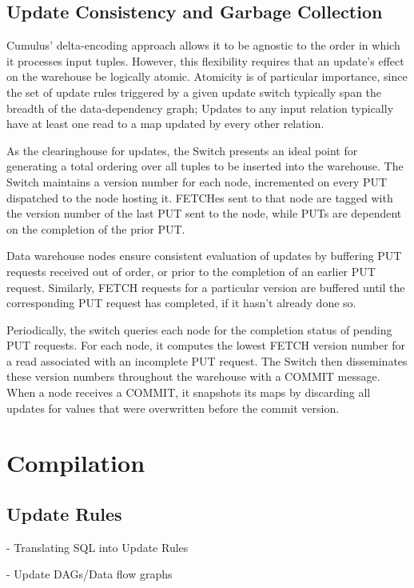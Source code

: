 \documentclass{sig-alternate}
\begin{document}
\subsection{Update Consistency and Garbage Collection}

Cumulus' delta-encoding approach allows it to be agnostic to the order in which it processes input tuples.  However, this flexibility requires that an update's effect on the warehouse be logically atomic.  Atomicity is of particular importance, since the set of update rules triggered by a given update switch typically span the breadth of the data-dependency graph; Updates to any input relation typically have at least one read to a map updated by every other relation.

As the clearinghouse for updates, the Switch presents an ideal point for generating a total ordering over all tuples to be inserted into the warehouse.  The Switch maintains a version number for each node, incremented on every PUT dispatched to the node hosting it.  FETCHes sent to that node are tagged with the version number of the last PUT sent to the node, while PUTs are dependent on the completion of the prior PUT.

Data warehouse nodes ensure consistent evaluation of updates by buffering PUT requests received out of order, or prior to the completion of an earlier PUT request.  Similarly, FETCH requests for a particular version are buffered until the corresponding PUT request has completed, if it hasn't already done so.

Periodically, the switch queries each node for the completion status of pending PUT requests.  For each node, it computes the lowest FETCH version number for a read associated with an incomplete PUT request.  The Switch then disseminates these version numbers throughout the warehouse with a COMMIT message.  When a node receives a COMMIT, it snapshots its maps by discarding all updates for values that were overwritten before the commit version.

\section{Compilation}
\label{sec:compilation}

\subsection{Update Rules}
- Translating SQL into Update Rules

- Update DAGs/Data flow graphs
\end{document}
